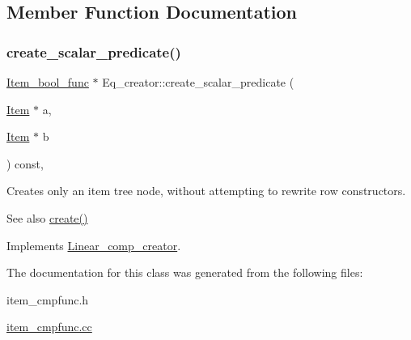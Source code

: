 \subsection{Member Function Documentation}
\mbox{\label{classEq__creator_ac63960f7bc029779aba59e9492663e2d}} 
\subsubsection{\texorpdfstring{create\+\_\+scalar\+\_\+predicate()}{create\_scalar\_predicate()}}
{\footnotesize\ttfamily \mbox{\hyperlink{classItem__bool__func}{Item\+\_\+bool\+\_\+func}} $\ast$ Eq\+\_\+creator\+::create\+\_\+scalar\+\_\+predicate (\begin{DoxyParamCaption}\item[{\mbox{\hyperlink{classItem}{Item}} $\ast$}]{a,  }\item[{\mbox{\hyperlink{classItem}{Item}} $\ast$}]{b }\end{DoxyParamCaption}) const\hspace{0.3cm}{\ttfamily [protected]}, {\ttfamily [virtual]}}

Creates only an item tree node, without attempting to rewrite row constructors. \begin{DoxySeeAlso}{See also}
\mbox{\hyperlink{classLinear__comp__creator_abf8d17944a06f0f90a187f4d99e06319}{create()}} 
\end{DoxySeeAlso}


Implements \mbox{\hyperlink{classLinear__comp__creator_ad77c92f078a60d9026d394fa55d80a49}{Linear\+\_\+comp\+\_\+creator}}.



The documentation for this class was generated from the following files\+:\begin{DoxyCompactItemize}
\item 
item\+\_\+cmpfunc.\+h\item 
\mbox{\hyperlink{item__cmpfunc_8cc}{item\+\_\+cmpfunc.\+cc}}\end{DoxyCompactItemize}
